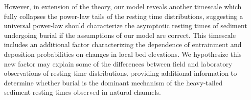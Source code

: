 \documentclass[draft]{agujournal2018}
\begin{document}
However, in extension of the \citet{Martin2014} theory, our model reveals another timescale which fully collapses the power-law tails of the resting time distributions, suggesting a universal power-law should characterize the asymptotic resting times of sediment undergoing burial if the assumptions of our model are correct.
This timescale includes an additional factor characterizing the dependence of entrainment and deposition probabilities on changes in local bed elevations.
We hypothesize this new factor may explain some of the differences between field \citep[e.g.][]{Olinde2015} and laboratory \citep[e.g.][]{Martin2014} observations of resting time distributions, providing additional information to determine whether burial is the dominant mechanism of the heavy-tailed sediment resting times observed in natural channels.
\end{document}
